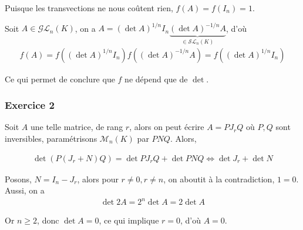 \documentclass{article}
\begin{document}
Puisque les transvections ne nous coûtent rien, $f(A) = f(I_n) = 1$.

Soit $A\in\mathcal{G}\mathcal{L}_n(K)$, on a $A = (\det A)^{1/n}I_n \underbrace{(\det A)^{-1/n}A}_{\in\mathcal{S}\mathcal{L}_n(K) }$, d'où 
\begin{align*}f(A) = f( (\det A)^{1/n}I_n)f((\det A)^{-1/n}A)= f( (\det A)^{1/n}I_n)
\end{align*}

Ce qui permet de conclure que $f$ ne dépend que de $\det$.
\subsubsection*{Exercice 2}
Soit $A$ une telle matrice, de rang $r$, alors on peut écrire $A = PJ_rQ$ où $P,Q$ sont inversibles, paramétrisons $\mathcal{M}_n(K)$ par $PNQ$. Alors,

\begin{align*}
\det {(P(J_r+N)Q)} = \det{PJ_rQ}+\det{PNQ}\Longleftrightarrow \det{J_r}+\det{N}
\end{align*}

Posons, $N = I_n-J_r$, alors pour $r\neq 0, r\neq n$, on aboutit à la contradiction, $1 = 0$. Aussi, on a 
\begin{align*}
\det{2A} = 2^n \det A = 2\det A
\end{align*}

Or $n\geq 2$, donc $\det A = 0$, ce qui implique $r=0$, d'où $A=0$.
\end{document}
